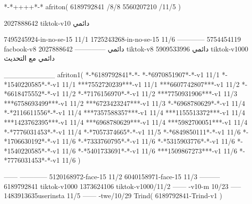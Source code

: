 *-*++++*-*
afriton(
6189792841 /8/8
5560207210 /11/5
)

2027888642 tiktok-v10
دائمي


7495245924-in-no-se-15 11/1
1725243268-in-no-se-15 11/6
------------
5754454119 facbook-v8
دائمي
--------------
2027888642 tiktok-v8
دائمي
5909533996 tiktok-v1000
دائمي مع التحديث

__________
afriton1(
*-*6189792841*-*-
*-*6970851907*-*-v1 11/1
*-*1540220585*-*-v1 11/1
***7552720239***-v1 11/1
***6607742807***-v1 11/2
*-*6618475552*-*-v1 11/2
*-*7176156970*-*-v1 11/2
***7750931906***-v1 11/3
***6758693499***-v1 11/2
***6723423247***-v1 11/3
*-*6968780629*-*-v1 11/4
*-*2116611556*-*-v1 11/4
***7357588357***-v1 11/4
***1155513372***-v1 11/4
***1423762395***-v1 11/4
***6968780629***-v1 11/4
***5982700051***-v1 11/4
*-*7776031453*-*-v1 11/4
*-*7057374665*-*-v1 11/5
*-*6849850111*-*-v1 11/6
*-*1706630192*-*-v1 11/6
*-*7333760795*-*-v1 11/6
*-*5315903776*-*-v1 11/6
*-*1540220585*-*-v1 11/6
*-*5401733691*-*-v1 11/6
***1509867273***-v1 11/6
*-*7776031453*-*-v1 11/6
)

------
------------
5120168972-face-15 11/2
6040158971-face-15 11/3
---------
6189792841 tiktok-v1000
1373624106 tiktok-v1000/11/2
------
-v10-m 10/23
-----
1483913635userinsta 11/5
------
-twe/10/29
Trind(
6189792841-Trind-v1 
)
